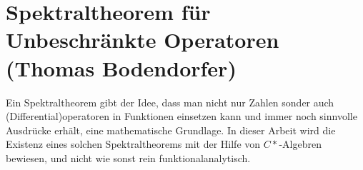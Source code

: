 \section{Spektraltheorem f\"ur Unbeschr\"ankte Operatoren
(Thomas Bodendorfer)}

Ein Spektraltheorem gibt der Idee, dass man nicht nur Zahlen sonder auch
(Differential)operatoren in Funktionen einsetzen kann und immer noch sinnvolle
Ausdrücke erhält, eine mathematische Grundlage. In dieser Arbeit wird die
Existenz eines solchen Spektraltheorems mit der Hilfe von $C*$-Algebren
bewiesen, und nicht wie sonst rein funktionalanalytisch.

